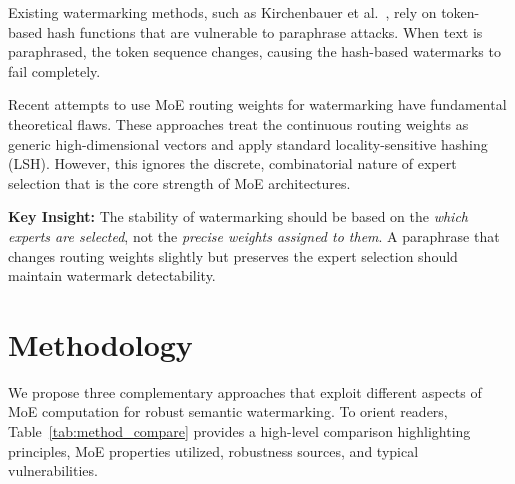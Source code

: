 Existing watermarking methods, such as Kirchenbauer et al.~\cite{kirchenbauer2023watermark}, rely on token-based hash functions that are vulnerable to paraphrase attacks. When text is paraphrased, the token sequence changes, causing the hash-based watermarks to fail completely.

Recent attempts to use MoE routing weights for watermarking have fundamental theoretical flaws. These approaches treat the continuous routing weights as generic high-dimensional vectors and apply standard locality-sensitive hashing (LSH). However, this ignores the discrete, combinatorial nature of expert selection that is the core strength of MoE architectures.

\textbf{Key Insight:} The stability of watermarking should be based on the \textit{which experts are selected}, not the \textit{precise weights assigned to them}. A paraphrase that changes routing weights slightly but preserves the expert selection should maintain watermark detectability.

\section{Methodology}

We propose three complementary approaches that exploit different aspects of MoE computation for robust semantic watermarking. To orient readers, Table~\ref{tab:method_compare} provides a high-level comparison highlighting principles, MoE properties utilized, robustness sources, and typical vulnerabilities.

